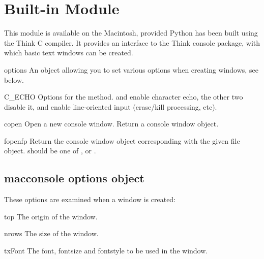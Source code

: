 \section{Built-in Module }
\label{module-macconsole}


This module is available on the Macintosh, provided Python has been
built using the Think C compiler. It provides an interface to the
Think console package, with which basic text windows can be created.

\begin{datadesc}{options}
An object allowing you to set various options when creating windows,
see below.
\end{datadesc}

\begin{datadesc}{C_ECHO}
Options for the  method.  and 
enable character echo, the other two disable it,  and
 enable line-oriented input (erase/kill processing,
etc).
\end{datadesc}

\begin{funcdesc}{copen}{}
Open a new console window. Return a console window object.
\end{funcdesc}

\begin{funcdesc}{fopen}{fp}
Return the console window object corresponding with the given file
object.  should be one of ,  or
.
\end{funcdesc}

\subsection{macconsole options object}
These options are examined when a window is created:

\begin{datadesc}{top}
The origin of the window.
\end{datadesc}

\begin{datadesc}{nrows}
The size of the window.
\end{datadesc}

\begin{datadesc}{txFont}
The font, fontsize and fontstyle to be used in the window.
\end{datadesc}

